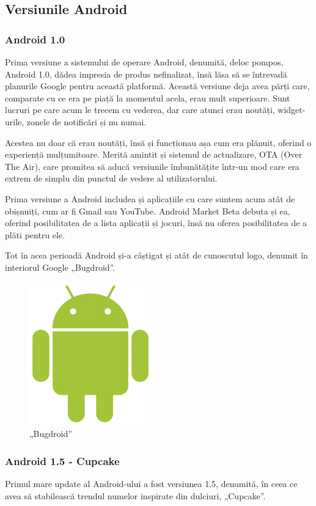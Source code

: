 \documentclass[12pt,a4paper]{article}
\begin{document}
\subsection{Versiunile Android}
\subsubsection{Android 1.0}
Prima versiune a sistemului de operare Android, denumită, deloc pompos, Android 1.0, dădea impresia de produs nefinalizat, însă lăsa să se întrevadă planurile Google pentru această platformă. Această versiune deja avea părți care, comparate cu ce era  pe piață la momentul acela, erau mult superioare. Sunt lucruri pe care acum le trecem cu vederea, dar care atunci erau noutăți, widget-urile, zonele de notificări și nu numai. 

Acestea nu doar că erau noutăți, însă și funcționau așa cum era plănuit, oferind o experiență mulțumitoare. Merită amintit și sistemul de actualizare, OTA (Over The Air), care promitea să aducă versiunile îmbunătățite într-un mod care era extrem de simplu din punctul de vedere al utilizatorului.

Prima versiune a Android includea și aplicațiile cu care suntem acum atât de obișnuiți, cum ar fi Gmail sau YouTube. Android Market Beta debuta și ea, oferind posibilitatea de a lista aplicații și jocuri, însă nu oferea posibilitatea de a plăti pentru ele.

Tot în acea perioadă Android și-a câștigat și atât de cunoscutul logo, denumit în interiorul Google „Bugdroid”.

\begin{figure}[hbtp]
\centering
\includegraphics[scale=0.6]{figures/Android_Robot_200.png}
\caption{„Bugdroid”}
\end{figure}


\subsubsection{Android 1.5 - Cupcake}
Primul mare update al Android-ului a fost versiunea 1.5, denumită, în ceea ce avea să stabilească trendul numelor inspirate din dulciuri, „Cupcake”.
\end{document}

